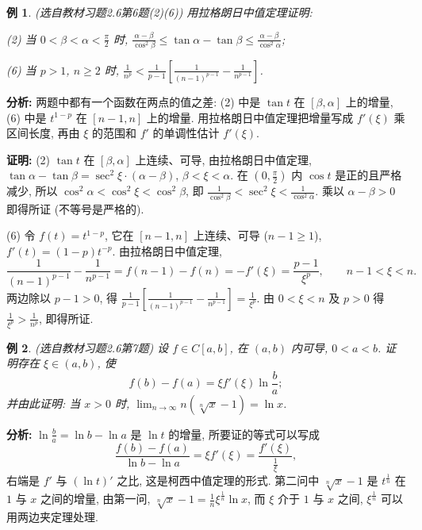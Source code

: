 \documentclass[UTF8,openany]{ctexbook}
\theoremstyle{chinesetextbook}
\newtheorem{example}{例}[section]
\newenvironment{cnproof}{\par\indent\textbf{证明:} \ignorespaces}{\par}
\begin{document}
\begin{example}\label{ex:c2-h6-6}
\textnormal{(选自教材习题2.6第6题(2)(6))} 用拉格朗日中值定理证明:

(2) 当 $\displaystyle0<\beta<\alpha<\frac\pi2$ 时, $\displaystyle\frac{\alpha-\beta}{\cos^2\beta}\le\tan\alpha-\tan\beta\le\frac{\alpha-\beta}{\cos^2\alpha}$;

(6) 当 $p>1$, $n\ge2$ 时, $\displaystyle\frac1{n^p}<\frac1{p-1}\left[\frac1{(n-1)^{p-1}}-\frac1{n^{p-1}}\right]$.
\end{example}
\par\indent\textbf{分析:} 两题中都有一个函数在两点的值之差: (2) 中是 $\tan t$ 在 $[\beta,\alpha]$ 上的增量, (6) 中是 $t^{1-p}$ 在 $[n-1,n]$ 上的增量. 用拉格朗日中值定理把增量写成 $f'(\xi)$ 乘区间长度, 再由 $\xi$ 的范围和 $f'$ 的单调性估计 $f'(\xi)$.
\begin{cnproof}
(2) $\tan t$ 在 $[\beta,\alpha]$ 上连续、可导, 由拉格朗日中值定理, $\tan\alpha-\tan\beta=\sec^2\xi\cdot(\alpha-\beta)$, $\beta<\xi<\alpha$. 在 $\displaystyle\left(0,\frac\pi2\right)$ 内 $\cos t$ 是正的且严格减少, 所以 $\cos^2\alpha<\cos^2\xi<\cos^2\beta$, 即 $\displaystyle\frac1{\cos^2\beta}<\sec^2\xi<\frac1{\cos^2\alpha}$. 乘以 $\alpha-\beta>0$ 即得所证 (不等号是严格的).

(6) 令 $f(t)=t^{1-p}$, 它在 $[n-1,n]$ 上连续、可导 ($n-1\ge1$), $f'(t)=(1-p)t^{-p}$. 由拉格朗日中值定理,
\[
\frac1{(n-1)^{p-1}}-\frac1{n^{p-1}}=f(n-1)-f(n)=-f'(\xi)=\frac{p-1}{\xi^p},\qquad n-1<\xi<n.
\]
两边除以 $p-1>0$, 得 $\displaystyle\frac1{p-1}\left[\frac1{(n-1)^{p-1}}-\frac1{n^{p-1}}\right]=\frac1{\xi^p}$. 由 $0<\xi<n$ 及 $p>0$ 得 $\displaystyle\frac1{\xi^p}>\frac1{n^p}$, 即得所证.
\end{cnproof}
\begin{example}\label{ex:c2-h6-7}
\textnormal{(选自教材习题2.6第7题)} 设 $f\in C[a,b]$, 在 $(a,b)$ 内可导, $0<a<b$. 证明存在 $\xi\in(a,b)$, 使
\[
f(b)-f(a)=\xi f'(\xi)\ln\frac ba;
\]
并由此证明: 当 $x>0$ 时, $\displaystyle\lim_{n\to\infty}n\left(\sqrt[n]x-1\right)=\ln x$.
\end{example}
\par\indent\textbf{分析:} $\displaystyle\ln\frac ba=\ln b-\ln a$ 是 $\ln t$ 的增量, 所要证的等式可以写成
\[
\frac{f(b)-f(a)}{\ln b-\ln a}=\xi f'(\xi)=\frac{f'(\xi)}{\frac1\xi},
\]
右端是 $f'$ 与 $(\ln t)'$ 之比, 这是柯西中值定理的形式. 第二问中 $\sqrt[n]x-1$ 是 $t^{\frac1n}$ 在 $1$ 与 $x$ 之间的增量, 由第一问, $\displaystyle\sqrt[n]x-1=\frac1n\xi^{\frac1n}\ln x$, 而 $\xi$ 介于 $1$ 与 $x$ 之间, $\xi^{\frac1n}$ 可以用两边夹定理处理.
\end{document}
